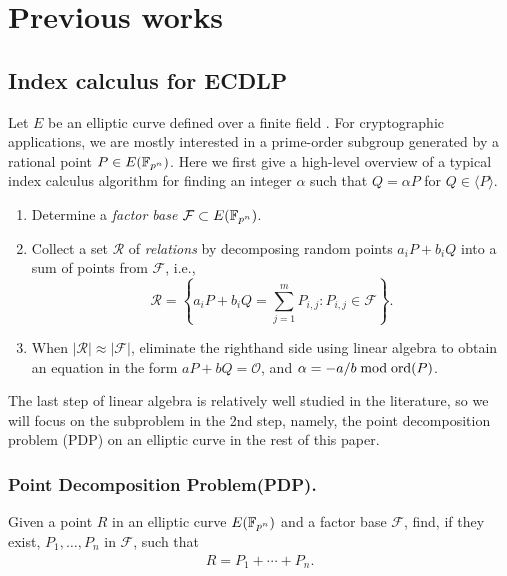 %
%

\section{Previous works}
\subsection{Index calculus for ECDLP}
%
\label{sec:index-calculus-ecdlp}
%
Let $E$ be an elliptic curve defined over a finite field .
%
For cryptographic applications, we are mostly interested in a
prime-order subgroup generated by a rational point $P\in E(\mathbb F_{p^n})$.
%
Here we first give a high-level overview of a typical index calculus
algorithm for finding an integer $\alpha$ such that $Q=\alpha P$ for
$Q\in\langle P\rangle$.
%
\begin{enumerate}
%
\item Determine a \emph{factor base} $\mathcal F\subset E(\mathbb F_{p^n})$.
%
\item Collect a set $\mathcal R$ of \emph{relations} by decomposing
  random points $a_iP+b_iQ$ into a sum of points from $\mathcal F$,
  i.e.,
  \[ \mathcal
    R=\left\{a_iP+b_iQ=\sum_{j=1}^mP_{i,j}:P_{i,j}\in\mathcal
      F\right\}. \]
%
\item When $|\mathcal R|\approx|\mathcal F|$, eliminate the righthand
  side using linear algebra to obtain an equation in the form
  $aP+bQ=\mathcal O$, and $\alpha=-a/b\bmod\operatorname{ord}(P)$.
%
\end{enumerate}
%
The last step of linear algebra is relatively well studied in the
literature, so we will focus on the subproblem in the 2nd step,
namely, the point decomposition problem (PDP) on an elliptic curve in
the rest of this paper.
%
\subsubsection{Point Decomposition Problem(PDP).}
  Given a point $R$ in an elliptic curve $E(\mathbb F_{p^n})$ and a 
  factor base $\mathcal F$, find, if they exist, 
  $P_1, \dots, P_n$ in $\mathcal F$, such that
  \begin{align*}
    R=P_1 + \cdots + P_n.
  \end{align*}



